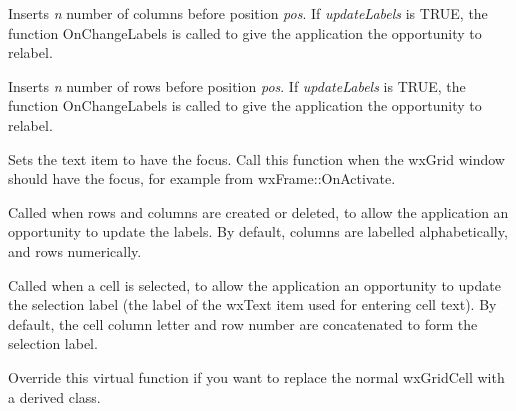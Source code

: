 \label{wxgridinsertcols}


Inserts {\it n} number of columns before position {\it pos}. If {\it updateLabels} is TRUE,
the function OnChangeLabels is called to give the application the opportunity to relabel.

\label{wxgridinsertrows}


Inserts {\it n} number of rows before position {\it pos}. If {\it updateLabels} is TRUE,
the function OnChangeLabels is called to give the application the opportunity to relabel.

\label{wxgridonactivate}


Sets the text item to have the focus. Call this function when the wxGrid window should have the
focus, for example from wxFrame::OnActivate.

\label{wxgridonchangelabels}


Called when rows and columns are created or deleted, to allow the application an
opportunity to update the labels. By default, columns are labelled alphabetically,
and rows numerically.

\label{wxgridonchangeselectionlabel}


Called when a cell is selected, to allow the application an
opportunity to update the selection label (the label of the wxText item
used for entering cell text). By default, the cell column letter and row
number are concatenated to form the selection label.

\label{wxgridoncreatecell}


Override this virtual function if you want to replace the normal wxGridCell with a derived
class.

\label{wxgridoncellleftclick}


